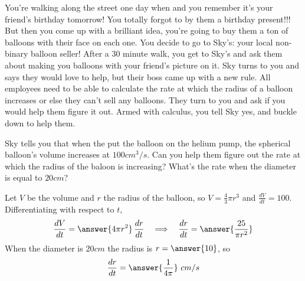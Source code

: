 \documentclass{ximera}
\begin{document}
\begin{example}\label{example:8-5}
You're walking along the street one day when and you remember it's your friend's birthday tomorrow! You totally forgot to by them a birthday present!!! But then you come up with a brilliant idea, you're going to buy them a ton of balloons with their face on each one. You decide to go to Sky's: your local non-binary balloon seller! After a 30 minute walk, you get to Sky's and ask them about making you balloons with your friend's picture on it. Sky turns to you and says they would love to help, but their boss came up with a new rule. All employees need to be able to calculate the rate at which the radius of a balloon increases or else they can't sell any balloons. They turn to you and ask if you would help them figure it out. Armed with calculus, you tell Sky yes, and buckle down to help them.

Sky tells you that when the put the balloon on the helium pump, the spherical balloon's volume increases at $100 cm^{3} / s$. Can you help them figure out the rate at which the radius of the baloon is increasing? What's the rate when the diameter is equal to $20 cm$?

Let $V$ be the volume and $r$ the radius of the balloon, so $V=\frac{4}{3}\pi r^{3}$ and $\frac{dV}{dt}=100$. Differentiating with respect to $t$,
\[
\frac{dV}{dt}=\answer{4\pi r^{2}}\,\frac{dr}{dt}
\quad\Longrightarrow\quad
\frac{dr}{dt}=\answer{\frac{25}{\pi r^{2}}}
\]
When the diameter is $20 cm$ the radius is $r=\answer{10}$, so
\[
\frac{dr}{dt}=\answer{\frac{1}{4\pi}}\ cm/s
\]
\end{example}
\end{document}
